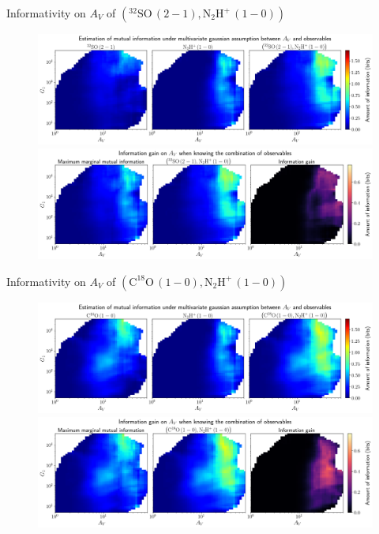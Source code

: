 \documentclass{beamer}
\begin{document}
\begin{frame}{Informativity on $A_V$ of $\left(\mathrm{^{32}SO\,(2-1)},\mathrm{N_2H^+\,(1-0)}\right)$}
    \begin{figure}
        \centering
        \includegraphics[width=0.95\linewidth]{../linearinfogauss/av__32so21_n2hp10_linearinfogauss.png}
        \vfill
        \includegraphics[width=0.95\linewidth]{../linearinfogauss/av__32so21_n2hp10_linearinfogauss_gain.png}
    \end{figure}
\end{frame}

\begin{frame}{Informativity on $A_V$ of $\left(\mathrm{C^{18}O\,(1-0)},\mathrm{N_2H^+\,(1-0)}\right)$}
    \begin{figure}
        \centering
        \includegraphics[width=0.95\linewidth]{../linearinfogauss/av__c18o10_n2hp10_linearinfogauss.png}
        \vfill
        \includegraphics[width=0.95\linewidth]{../linearinfogauss/av__c18o10_n2hp10_linearinfogauss_gain.png}
    \end{figure}
\end{frame}
\end{document}
